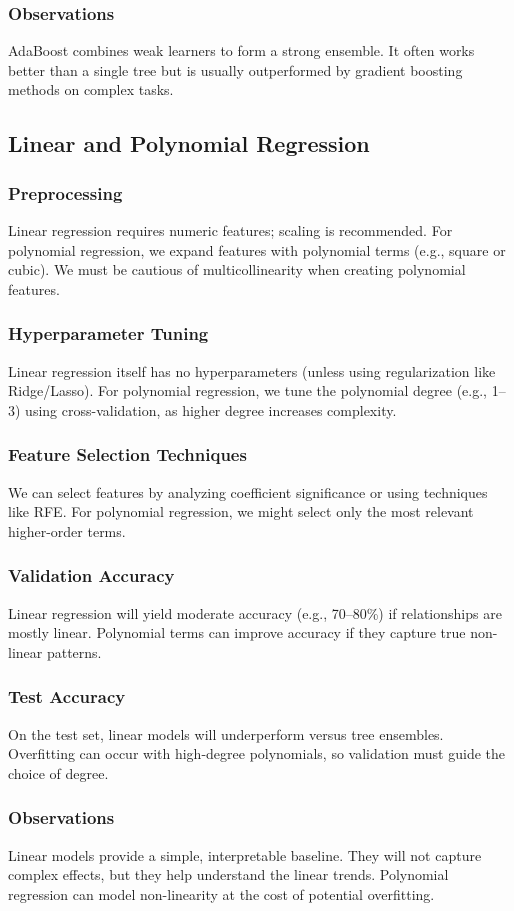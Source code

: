 \documentclass[12pt]{article}
\begin{document}
\subsubsection{Observations}
AdaBoost combines weak learners to form a strong ensemble. It often works better than a single tree but is usually outperformed by gradient boosting methods on complex tasks.

\subsection{Linear and Polynomial Regression}
\subsubsection{Preprocessing}
Linear regression requires numeric features; scaling is recommended. For polynomial regression, we expand features with polynomial terms (e.g., square or cubic). We must be cautious of multicollinearity when creating polynomial features.
\subsubsection{Hyperparameter Tuning}
Linear regression itself has no hyperparameters (unless using regularization like Ridge/Lasso). For polynomial regression, we tune the polynomial degree (e.g., 1--3) using cross-validation, as higher degree increases complexity.
\subsubsection{Feature Selection Techniques}
We can select features by analyzing coefficient significance or using techniques like RFE. For polynomial regression, we might select only the most relevant higher-order terms.
\subsubsection{Validation Accuracy}
Linear regression will yield moderate accuracy (e.g., 70--80\%) if relationships are mostly linear. Polynomial terms can improve accuracy if they capture true non-linear patterns.
\subsubsection{Test Accuracy}
On the test set, linear models will underperform versus tree ensembles. Overfitting can occur with high-degree polynomials, so validation must guide the choice of degree.
\subsubsection{Observations}
Linear models provide a simple, interpretable baseline. They will not capture complex effects, but they help understand the linear trends. Polynomial regression can model non-linearity at the cost of potential overfitting.
\end{document}
